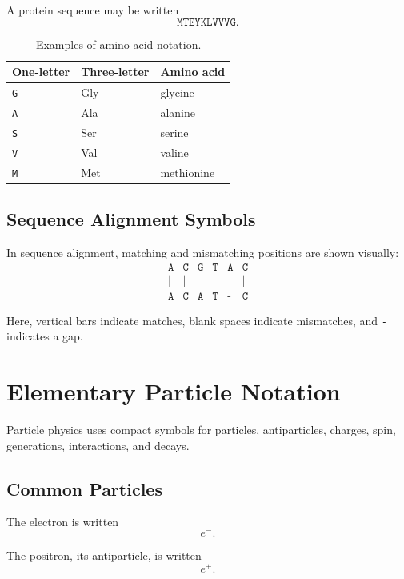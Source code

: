 \documentclass[11pt,twocolumn]{article}
\begin{document}
A protein sequence may be written
\[
\texttt{MTEYKLVVVG}.
\]

\begin{table}[ht]
\centering
\small
\caption{Examples of amino acid notation.}
\begin{tabular}{lll}
\toprule
One-letter & Three-letter & Amino acid \\
\midrule
\texttt{G} & Gly & glycine \\
\texttt{A} & Ala & alanine \\
\texttt{S} & Ser & serine \\
\texttt{V} & Val & valine \\
\texttt{M} & Met & methionine \\
\bottomrule
\end{tabular}
\end{table}

\subsection{Sequence Alignment Symbols}

In sequence alignment, matching and mismatching positions are shown visually:
\[
\begin{array}{cccccc}
\texttt{A} & \texttt{C} & \texttt{G} & \texttt{T} & \texttt{A} & \texttt{C}\\
\vert      & \vert      &           & \vert      &           & \vert\\
\texttt{A} & \texttt{C} & \texttt{A} & \texttt{T} & \texttt{-} & \texttt{C}
\end{array}
\]

Here, vertical bars indicate matches, blank spaces indicate mismatches, and
\texttt{-} indicates a gap.

\section{Elementary Particle Notation}

Particle physics uses compact symbols for particles, antiparticles, charges,
spin, generations, interactions, and decays.

\subsection{Common Particles}

The electron is written
\[
e^-.
\]

The positron, its antiparticle, is written
\[
e^+.
\]
\end{document}
